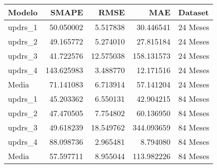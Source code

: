 \begin{tabular}{lrrrl}
\toprule
Modelo & SMAPE & RMSE & MAE & Dataset \\
\midrule
updrs_1 & 50.050002 & 5.517838 & 30.446541 & 24 Meses \\
updrs_2 & 49.165772 & 5.274010 & 27.815184 & 24 Meses \\
updrs_3 & 41.722576 & 12.575038 & 158.131573 & 24 Meses \\
updrs_4 & 143.625983 & 3.488770 & 12.171516 & 24 Meses \\
Media & 71.141083 & 6.713914 & 57.141204 & 24 Meses \\
updrs_1 & 45.203362 & 6.550131 & 42.904215 & 84 Meses \\
updrs_2 & 47.470505 & 7.754802 & 60.136950 & 84 Meses \\
updrs_3 & 49.618239 & 18.549762 & 344.093659 & 84 Meses \\
updrs_4 & 88.098736 & 2.965481 & 8.794080 & 84 Meses \\
Media & 57.597711 & 8.955044 & 113.982226 & 84 Meses \\
\bottomrule
\end{tabular}
